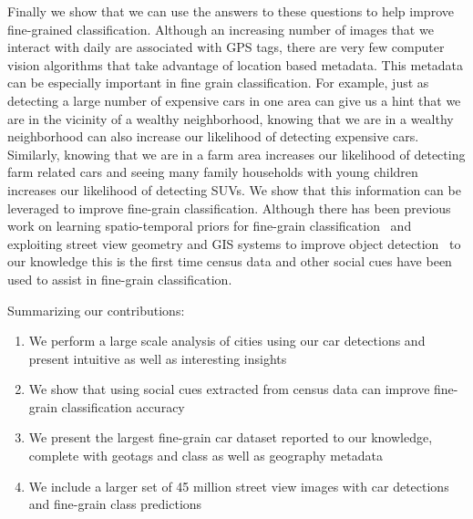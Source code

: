 \documentclass[10pt,twocolumn,letterpaper]{article}
\begin{document}
Finally we show that we can use the answers to these questions to help improve fine-grained classification. Although an increasing number of images that we interact with daily are associated with GPS tags, there are very few computer vision algorithms that take advantage of location based metadata. This metadata can be especially important in fine grain classification. For example, just as detecting a large number of expensive cars in one area can give us a hint that we are in the vicinity of a wealthy neighborhood, knowing that we are in a wealthy neighborhood can also increase our likelihood of detecting expensive cars. Similarly, knowing that we are in a farm area increases our likelihood of detecting farm related cars and seeing many family households with young children increases our likelihood of detecting SUVs. We show that this information can be leveraged to improve fine-grain classification. Although there has been previous work on learning spatio-temporal priors for fine-grain classification~\cite{birdsnap} and exploiting street view geometry and GIS systems to improve object detection~\cite{nyc3D,amir} to our knowledge this is the first time census data and other social cues have been used to assist in fine-grain classification.  


Summarizing our contributions:
  \begin{enumerate}
    \item We perform a large scale analysis of cities using our car detections and present intuitive as well as interesting insights
    \item We show that using social cues extracted from census data can improve fine-grain classification accuracy
    \item We present the largest fine-grain car dataset reported to our knowledge, complete with geotags and class as well as geography metadata  
    \item We include a larger set of 45 million street view images with car detections and fine-grain class predictions
  \end{enumerate}

\end{document}
